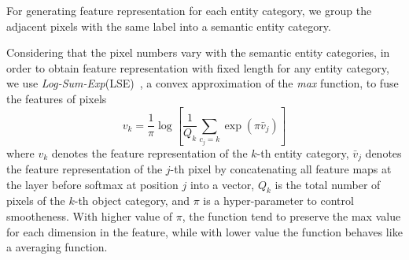\documentclass[10pt,twocolumn,letterpaper]{article}
\begin{document}
For generating feature representation for each entity category, we group the adjacent pixels with the same label into a semantic entity category.

Considering that the pixel numbers vary with the semantic entity categories, in order to obtain feature representation with fixed length for any entity category, we use \textit{Log-Sum-Exp}(LSE)~\cite{boyd2004convex}, a convex approximation of the \textit{max} function, to fuse the features of pixels
\begin{equation}\label{eq_feature}
v_k = \frac{1}{\pi}\log \left[\frac{1}{Q_k}\sum_{c_j = k} \exp (\pi \bar{v}_j) \right]
\end{equation}
where $v_k$ denotes the feature representation of the $k$-th entity category, $\bar{v}_j$ denotes the feature representation of the $j$-th pixel by concatenating all feature maps at the layer before softmax at position $j$ into a vector, $Q_k$ is the total number of pixels of the $k$-th object category, and $\pi$ is a hyper-parameter to control smootheness. With higher value of $\pi$, the function tend to preserve the max value for each dimension in the feature, while with lower value the function behaves like a averaging function.



\iffalse
\fi










\end{document}
